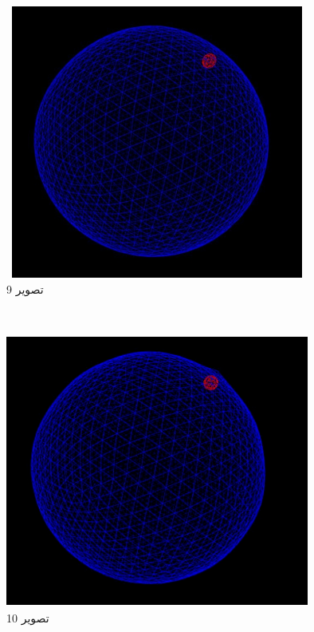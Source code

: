 \documentclass[12pt,onecolumn,a4paper]{report}
\begin{document}
\begin{center}
\includegraphics[width=10cm, height=9cm]{09.jpg}\\
\caption{تصویر 9}
\end{center}\\
\begin{center}
\includegraphics[width=10cm, height=9cm]{10.jpg}\\
\caption{تصویر 10}
\end{center}\\
\end{document}
